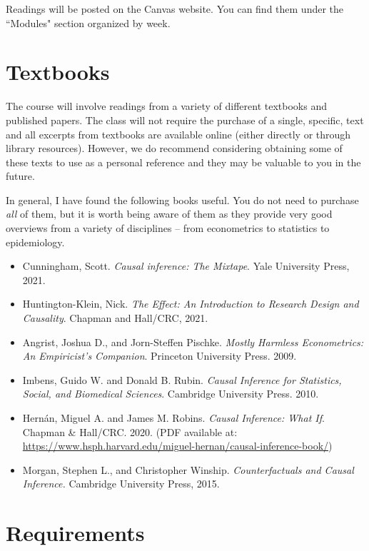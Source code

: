 \documentclass[11pt, article, oneside]{memoir}
\theoremstyle{Assumption}
\begin{document}
Readings will be posted on the Canvas website. You can find them under the ``Modules" section organized by week.


\section*{Textbooks} 

The course will involve readings from a variety of different textbooks and published papers. The class will not require the purchase of a single, specific, text and all excerpts from textbooks are available online (either directly or through library resources). However, we do recommend considering obtaining some of these texts to use as a personal reference and they may be valuable to you in the future.

In general, I have found the following books useful. You do not need to purchase \textit{all} of them, but it is worth being aware of them as they provide very good overviews from a variety of disciplines -- from econometrics to statistics to epidemiology.

\begin{itemize}
\item Cunningham, Scott. \emph{Causal inference: The Mixtape}. Yale University Press, 2021.
\item Huntington-Klein, Nick. \emph{The Effect: An Introduction to Research Design and Causality}. Chapman and Hall/CRC, 2021.
\item Angrist, Joshua D., and Jorn-Steffen Pischke. \emph{Mostly Harmless Econometrics: An Empiricist’s Companion}. Princeton University Press. 2009.
\item Imbens, Guido W. and Donald B. Rubin. \emph{Causal Inference for Statistics, Social, and Biomedical Sciences}. Cambridge University Press.  2010.
\item Hern\'an, Miguel A. and  James M. Robins. \emph{Causal Inference: What If}.  Chapman \& Hall/CRC. 2020. (PDF available at: \url{https://www.hsph.harvard.edu/miguel-hernan/causal-inference-book/})
\item Morgan, Stephen L., and Christopher Winship. \emph{Counterfactuals and Causal Inference.} Cambridge University Press, 2015.
\end{itemize}


\section*{Requirements}
\end{document}
